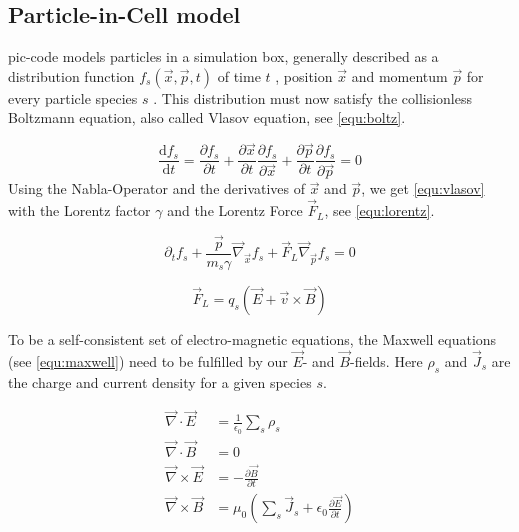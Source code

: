 \documentclass[bachelor_thesis]{subfiles}
\begin{document}
\subsection{Particle-in-Cell model} \label{chap:pic}
\Gls{pic}-code models particles in a simulation box, generally described as a distribution function $f_s(\vec{x}, \vec{p}, t)$ of time $t$ , position $\vec{x}$ and momentum $\vec{p}$ for every particle species $s$ \cite{PICRepo}.
This distribution must now satisfy the collisionless Boltzmann equation, also called Vlasov equation\cite{Vlasov1968}, see \autoref{equ:boltz}.

\begin{equation}
	\frac{\mathrm{d}f_s}{\mathrm{d}t}=\frac{\partial f_s}{\partial t} + \frac{\partial \vec{x}}{\partial t} \frac{\partial f_s}{\partial \vec{x}} + \frac{\partial \vec{p}}{\partial t} \frac{\partial f_s}{\partial \vec{p}} = 0
	\label{equ:boltz}
\end{equation}
Using the Nabla-Operator and the derivatives of $\vec{x}$ and $\vec{p}$, we get \autoref{equ:vlasov} with the Lorentz factor $\gamma$ and the Lorentz Force $\vec{F}_L$, see \autoref{equ:lorentz}.

\begin{equation}
	\partial_t f_s + \frac{\vec{p}}{m_s \gamma} \vec{\nabla}_{\vec{x}} f_s + \vec{F}_L \vec{\nabla}_{\vec{p}} f_s = 0
	\label{equ:vlasov}
\end{equation}

\begin{equation}
	\vec{F}_L=q_s\left(\vec{E}+\vec{v}\times\vec{B}\right)
	\label{equ:lorentz}
\end{equation}

To be a self-consistent set of electro-magnetic equations, the Maxwell equations (see \autoref{equ:maxwell}) need to be fulfilled by our $\vec{E}$- and $\vec{B}$-fields. Here $\rho_s$ and $\vec{J}_s$ are the charge and current density for a given species $s$.

\begin{equation}
\begin{aligned}
	\vec{\nabla}\cdot\vec{E}  &= \frac{1}{\epsilon_0}\sum_s \rho_s 									\\
	\vec{\nabla}\cdot\vec{B}  &= 0 														\\
	\vec{\nabla}\times\vec{E} &= -\frac{\partial \vec{B}}{\partial t}									\\
	\vec{\nabla}\times\vec{B}&= \mu_0 \left(\sum_s \vec{J}_s + \epsilon_0 \frac{\partial \vec{E}}{\partial t}\right)	
\end{aligned}
\label{equ:maxwell}
\end{equation}
\end{document}
